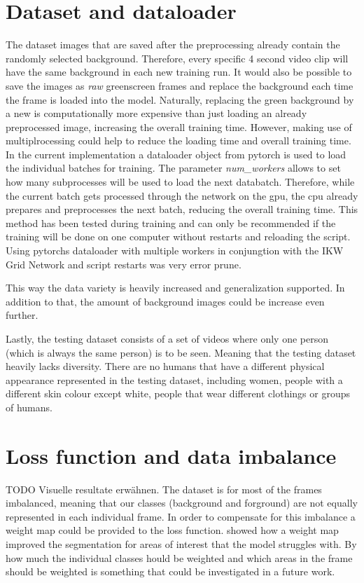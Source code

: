 \documentclass[11pt,
  paper=a4, 
  bibliography=totocnumbered,
	captions=tableheading,
	BCOR=10mm
]{scrreprt}
\theoremstyle{definition}
\begin{document}
\section{Dataset and dataloader}
The dataset images that are saved after the preprocessing already contain the randomly selected background.
Therefore, every specific 4 second video clip will have the same background in each new training run.
It would also be possible to save the images as \textit{raw} greenscreen frames and replace the background each time the frame is loaded into the model.
Naturally, replacing the green background by a new is computationally more expensive than just loading an already preprocessed image, increasing the overall training time.
However, making use of multiplrocessing could help to reduce the loading time and overall training time.
In the current implementation a dataloader \cite{dataloader2020} object from pytorch is used to load the individual batches for training.
The parameter \textit{num\_workers} allows to set how many subprocesses will be used to load the next databatch.
Therefore, while the current batch gets processed through the network on the \gls{gpu}, the \gls{cpu} already prepares and preprocesses the next batch, reducing the overall training time.
This method has been tested during training and can only be recommended if the training will be done on one computer without restarts and reloading the script.
Using pytorchs dataloader with multiple workers in conjungtion with the IKW Grid Network and script restarts was very error prune.

This way the data variety is heavily increased and generalization supported.
In addition to that, the amount of background images could be increase even further.


Lastly, the testing dataset consists of a set of videos where only one person (which is always the same person) is to be seen.
Meaning that the testing dataset heavily lacks diversity.
There are no humans that have a different physical appearance represented in the testing dataset, including women, people with a different skin colour except white, people that wear different clothings or groups of humans.


\section{Loss function and data imbalance}
TODO Visuelle resultate erwähnen.
The dataset is for most of the frames imbalanced, meaning that our classes (background and forground) are not equally represented in each individual frame.
In order to compensate for this imbalance a weight map could be provided to the loss function.
\textcite{Ronneberger2015} showed how a weight map improved the segmentation for areas of interest that the model struggles with.
By how much the individual classes hould be weighted and which areas in the frame should be weighted is something that could be investigated in a future work. 
\end{document}
